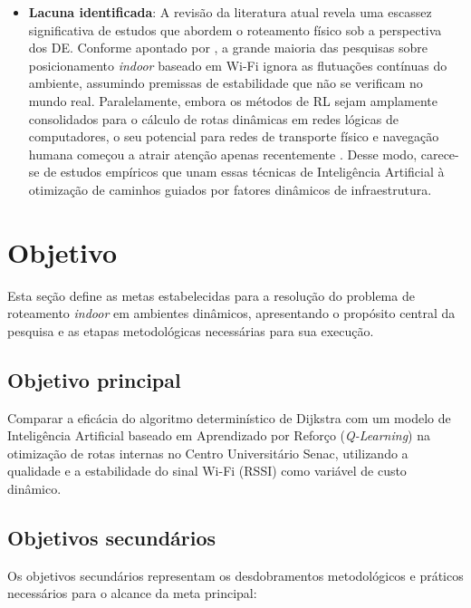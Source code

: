 \documentclass[
    12pt,                %
    openright,           %
    oneside,             %
    a4paper,             %
    english,             %
    brazil               %
]{abntex2}
\begin{document}
\begin{itemize}
    \item \textbf{Lacuna identificada}: A revisão da literatura atual revela uma escassez significativa de estudos que abordem o roteamento físico sob a perspectiva dos DE. Conforme apontado por , a grande maioria das pesquisas sobre posicionamento \textit{indoor} baseado em Wi-Fi ignora as flutuações contínuas do ambiente, assumindo premissas de estabilidade que não se verificam no mundo real. Paralelamente, embora os métodos de RL sejam amplamente consolidados para o cálculo de rotas dinâmicas em redes lógicas de computadores, o seu potencial para redes de transporte físico e navegação humana começou a atrair atenção apenas recentemente \cite{Pham2025}. Desse modo, carece-se de estudos empíricos que unam essas técnicas de Inteligência Artificial à otimização de caminhos guiados por fatores dinâmicos de infraestrutura.
\end{itemize}
\section{Objetivo}
\label{sec:objetivo}

Esta seção define as metas estabelecidas para a resolução do problema de roteamento \textit{indoor} em ambientes dinâmicos, apresentando o propósito central da pesquisa e as etapas metodológicas necessárias para sua execução.

\subsection{Objetivo principal}

Comparar a eficácia do algoritmo determinístico de Dijkstra com um modelo de Inteligência Artificial baseado em Aprendizado por Reforço (\textit{Q-Learning}) na otimização de rotas internas no Centro Universitário Senac, utilizando a qualidade e a estabilidade do sinal Wi-Fi (RSSI) como variável de custo dinâmico.

\subsection{Objetivos secundários}

Os objetivos secundários representam os desdobramentos metodológicos e práticos necessários para o alcance da meta principal:
\end{document}
